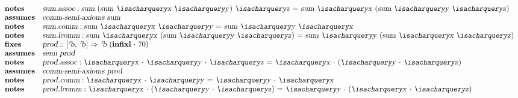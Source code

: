 \begin{isabellebody}
\begin{isamarkuptext}
\[\begin{array}{ll}
  \textbf{notes} & \isa{sum{\isachardot}assoc}: \isa{{\isachardoublequote}sum\ {\isacharparenleft}sum\ {\isacharquery}x\ {\isacharquery}y{\isacharparenright}\ {\isacharquery}z\ {\isacharequal}\ sum\ {\isacharquery}x\ {\isacharparenleft}sum\ {\isacharquery}y\ {\isacharquery}z{\isacharparenright}{\isachardoublequote}} \\
  \textbf{assumes} & \isa{{\isachardoublequote}comm{\isacharunderscore}semi{\isacharunderscore}axioms\ sum{\isachardoublequote}} \\
  \textbf{notes} & \isa{sum{\isachardot}comm}: \isa{{\isachardoublequote}sum\ {\isacharquery}x\ {\isacharquery}y\ {\isacharequal}\ sum\ {\isacharquery}y\ {\isacharquery}x{\isachardoublequote}} \\
  \textbf{notes} & \isa{sum{\isachardot}lcomm}: \isa{{\isachardoublequote}sum\ {\isacharquery}x\ {\isacharparenleft}sum\ {\isacharquery}y\ {\isacharquery}z{\isacharparenright}\ {\isacharequal}\ sum\ {\isacharquery}y\ {\isacharparenleft}sum\ {\isacharquery}x\ {\isacharquery}z{\isacharparenright}{\isachardoublequote}} \\
  \textbf{fixes} & \isa{prod} :: \isa{{\isachardoublequote}{\isacharbrackleft}{\isacharprime}b{\isacharcomma}\ {\isacharprime}b{\isacharbrackright}\ {\isasymRightarrow}\ {\isacharprime}b{\isachardoublequote}}
    ~(\textbf{infixl}~\isa{{\isachardoublequote}{\isasymcdot}{\isachardoublequote}}~70) \\
  \textbf{assumes} & \isa{{\isachardoublequote}semi\ prod{\isachardoublequote}} \\
  \textbf{notes} & \isa{prod{\isachardot}assoc}: \isa{{\isachardoublequote}{\isacharquery}x\ {\isasymcdot}\ {\isacharquery}y\ {\isasymcdot}\ {\isacharquery}z\ {\isacharequal}\ {\isacharquery}x\ {\isasymcdot}\ {\isacharparenleft}{\isacharquery}y\ {\isasymcdot}\ {\isacharquery}z{\isacharparenright}{\isachardoublequote}} \\
  \textbf{assumes} & \isa{{\isachardoublequote}comm{\isacharunderscore}semi{\isacharunderscore}axioms\ prod{\isachardoublequote}} \\
  \textbf{notes} & \isa{prod{\isachardot}comm}: \isa{{\isachardoublequote}{\isacharquery}x\ {\isasymcdot}\ {\isacharquery}y\ {\isacharequal}\ {\isacharquery}y\ {\isasymcdot}\ {\isacharquery}x{\isachardoublequote}} \\
  \textbf{notes} & \isa{prod{\isachardot}lcomm}: \isa{{\isachardoublequote}{\isacharquery}x\ {\isasymcdot}\ {\isacharparenleft}{\isacharquery}y\ {\isasymcdot}\ {\isacharquery}z{\isacharparenright}\ {\isacharequal}\ {\isacharquery}y\ {\isasymcdot}\ {\isacharparenleft}{\isacharquery}x\ {\isasymcdot}\ {\isacharquery}z{\isacharparenright}{\isachardoublequote}} \\

\end{array}\]
\end{isamarkuptext}
\end{isabellebody}
